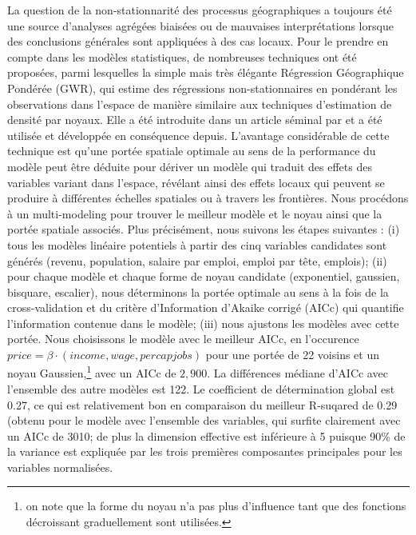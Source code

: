 {La question de la non-stationnarité des processus géographiques a toujours été une source d'analyses agrégées biaisées ou de mauvaises interprétations lorsque des conclusions générales sont appliquées à des cas locaux. Pour le prendre en compte dans les modèles statistiques, de nombreuses techniques ont été proposées, parmi lesquelles la simple mais très élégante Régression Géographique Pondérée (GWR), qui estime des régressions non-stationnaires en pondérant les observations dans l'espace de manière similaire aux techniques d'estimation de densité par noyaux. Elle a été introduite dans un article séminal par \cite{brunsdon1996geographically} et a été utilisée et développée en conséquence depuis. L'avantage considérable de cette technique est qu'une portée spatiale optimale au sens de la performance du modèle peut être déduite pour dériver un modèle qui traduit des effets des variables variant dans l'espace, révélant ainsi des effets locaux qui peuvent se produire à différentes échelles spatiales ou à travers les frontières. Nous procédons à un multi-modeling pour trouver le meilleur modèle et le noyau ainsi que la portée spatiale associés. Plus précisément, nous suivons les étapes suivantes : (i) tous les modèles linéaire potentiels à partir des cinq variables candidates sont générés (revenu, population, salaire par emploi, emploi par tête, emplois); (ii) pour chaque modèle et chaque forme de noyau candidate (exponentiel, gaussien, bisquare, escalier), nous déterminons la portée optimale au sens à la fois de la cross-validation et du critère d'Information d'Akaike corrigé (AICc) qui quantifie l'information contenue dans le modèle; (iii) nous ajustons les modèles avec cette portée. Nous choisissons le modèle avec le meilleur AICc, en l'occurence $price = \beta\cdot\left( income, wage, percapjobs\right)$ pour une portée de 22 voisins et un noyau Gaussien,\footnote{on note que la forme du noyau n'a pas plus d'influence tant que des fonctions décroissant graduellement sont utilisées.} avec un AICc de $2,900$. La différences médiane d'AICc avec l'ensemble des autre modèles est 122. Le coefficient de détermination global est 0.27, ce qui est relativement bon en comparaison du meilleur R-suqared de 0.29 (obtenu pour le modèle avec l'ensemble des variables, qui surfite clairement avec un AICc de 3010; de plus la dimension effective est inférieure à 5 puisque 90\% de la variance est expliquée par les trois premières composantes principales pour les variables normalisées.
}


